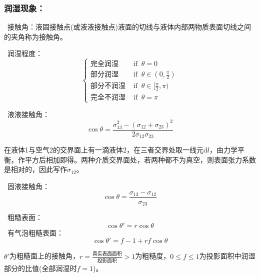 \documentclass[zihao=-4,UTF8]{report}
\begin{document}
\subsubsection{润湿现象：}
\par{}\ 接触角：液固接触点(或液液接触点)液面的切线与液体内部两物质表面切线之间的夹角称为接触角。    \par
{}\  润湿程度：
\begin{equation}
    \begin{cases}
        \text{完全润湿} & \text{ if }\  \theta=0 \\
        \text{部分润湿} & \text{ if }\  \theta \in (0,\frac{\pi}{2} ) \\
        \text{部分不润湿} & \text{ if }\  \theta \in [\frac{\pi }{2},\pi  )\\
        \text{完全不润湿} & \text{ if }\ \theta = \pi
    \end{cases}
\end{equation}   \par
{}\  液液接触角：
\begin{equation}
    \cos\theta = \frac{\sigma_{13}^2 - (\sigma_{12} +\sigma_{23})^2}{2\sigma_{12}\sigma_{23}}
\end{equation} 
{\par\color{gray}\small
在液体1与空气2的交界面上有一滴液体2，在三者交界处取一线元$\mathrm{d}l$，由力学平衡，作平方后相加即得。两种介质交界面处，若两种都不为真空，则表面张力系数是相对的，因此写作$\sigma_{12}$。
\par} \par
{}\ 固液接触角：
\begin{equation}
    \cos \theta = \frac{\sigma_{13} - \sigma_{12}}{\sigma_{23}}
\end{equation}\par
{}\ 粗糙表面：
\begin{equation}
    \cos \theta' = r\cos\theta
\end{equation}
\ 有气泡粗糙表面：
\begin{equation}
    \cos \theta' = f-1 + rf\cos\theta
\end{equation}
{\par\color{gray}\small
$\theta'$为粗糙面上的接触角，$r = \frac{\text{真实表面面积}}{\text{投影面积}} >1$为粗糙度，$0\le f\le 1$为投影面积中润湿部分的比值(全部润湿时$f=1$)。
\par}
\end{document}
